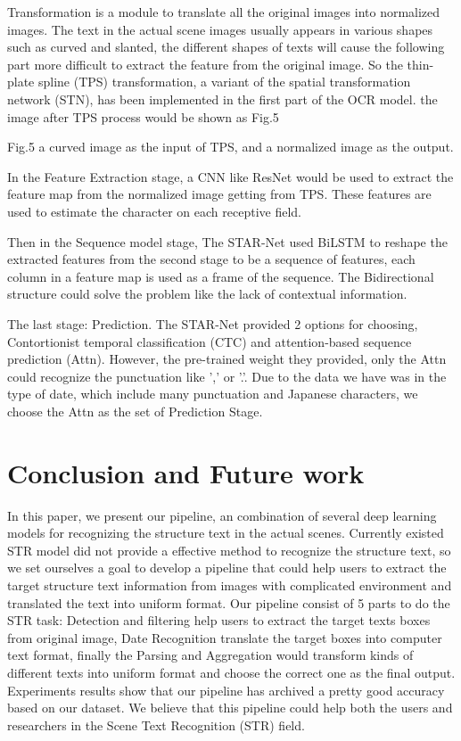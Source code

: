 \documentclass{article}
\begin{document}
Transformation is a module to translate all the original images into normalized images. The text in the actual scene images usually appears in various shapes  such as curved and slanted, the different shapes of texts will cause the following part more difficult to extract the feature from the original image. So the thin-plate spline (TPS) transformation, a variant of the spatial transformation network (STN), has been implemented in the first part of the OCR model. the image after TPS process would be shown as Fig.5 

Fig.5 a curved image as the input of TPS, and a normalized image as the output. 

In the Feature Extraction stage, a CNN like ResNet would be used to extract the feature map from the normalized image getting from TPS. These features are used to estimate the character on each receptive field.

Then in the Sequence model stage, The STAR-Net used BiLSTM to reshape the extracted features from the second stage to be a sequence of features, each column in a feature map is used as a frame of the sequence. The Bidirectional structure could solve the problem like the lack of contextual information.

The last stage: Prediction. The STAR-Net provided 2 options for choosing, Contortionist temporal classification (CTC) and attention-based sequence prediction (Attn). However, the pre-trained weight they provided, only the Attn could recognize the punctuation like ',' or '.'. Due to the data we have was in the type of date, which include many punctuation and Japanese characters, we choose the Attn as the set of Prediction Stage.

\section{Conclusion and Future work}

In this paper, we present our pipeline, an combination of several deep learning models for recognizing the structure text in the actual scenes. Currently existed STR model did not provide a effective method to recognize the structure text, so we set ourselves a goal to develop a pipeline that could help users to extract the target structure text information from images with complicated environment and translated the text into uniform format. Our pipeline consist of 5 parts to do the STR task: Detection and filtering help users to extract the target texts boxes from original image, Date Recognition translate the target boxes into computer text format, finally the Parsing and Aggregation would transform kinds of different texts into uniform format and choose the correct one as the final output. Experiments results show that our pipeline has archived a pretty good accuracy based on our dataset. We believe that this pipeline could help both the users and researchers in the Scene Text Recognition (STR) field.
\end{document}
